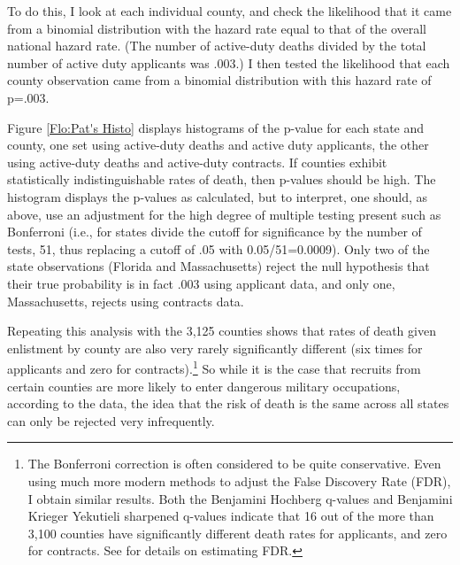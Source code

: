 \documentclass[12pt] {article}
\begin{document}
To do this, I look at each individual county, and check the likelihood that it came from a binomial distribution with the hazard rate equal to that of the overall national hazard rate. (The number of active-duty deaths divided by the total number
of active duty applicants was .003.) I then tested the likelihood
that each county observation came from a binomial distribution with this
hazard rate of p=.003. 

Figure \ref{Flo:Pat's Histo} displays
histograms of the p-value for each state and county, one set using active-duty deaths
and active duty applicants, the other using active-duty deaths and
active-duty contracts. If counties exhibit statistically indistinguishable rates of death, then p-values should be high. The histogram displays the p-values as calculated,
but to interpret, one should, as above, use an adjustment for the high degree of multiple testing present such as Bonferroni (i.e., for states divide the cutoff for significance by the number of tests, 51, thus replacing a cutoff of .05 with 0.05/51=0.0009). Only two
of the state observations (Florida and Massachusetts) reject the null
hypothesis that their true probability is in fact .003 using applicant
data, and only one, Massachusetts, rejects using contracts data. 

Repeating this analysis with the 3,125 counties shows that rates of death given enlistment by county are also very rarely significantly different (six times for applicants and zero for contracts).\footnote{The Bonferroni correction is often considered to be quite conservative. Even using much more modern methods to adjust the False Discovery Rate (FDR), I obtain similar results. Both the Benjamini Hochberg q-values and Benjamini Krieger Yekutieli sharpened q-values indicate that 16 out of the more than 3,100 counties have significantly different death rates for applicants, and zero for contracts. See \cite{BenHoch1995, BKY2006, Anderson2008} for details on estimating FDR.} So while it is the case that recruits from certain counties are more likely to enter dangerous military occupations, according to the data, the idea that the risk of death is the same across all states can only be rejected very infrequently. 
\end{document}
